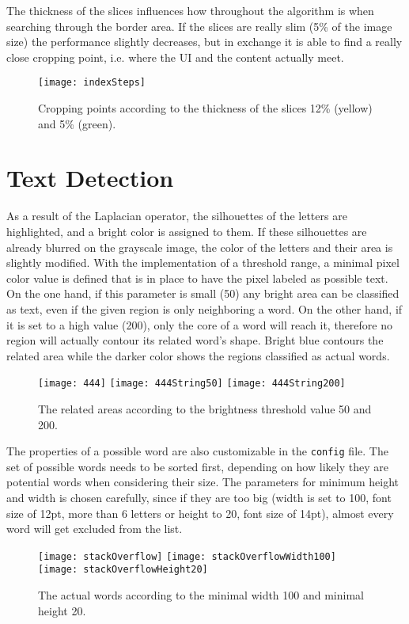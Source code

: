 \documentclass[draft,final]{vutinfth} %
\begin{document}
	The thickness of the slices influences how throughout the algorithm is when searching through the border area.
	If the slices are really slim (5\% of the image size) the performance slightly decreases, but in exchange it is able to find a really close cropping point, i.e. where the UI and the content actually meet.\par
	\begin{figure}[H]
		\centering
		\texttt{[image: indexSteps]}
		\caption{Cropping points according to the thickness of the slices 12\% (yellow) and 5\% (green).}
		\label{fig:res:steps}
	\end{figure}
	\section{Text Detection}
	As a result of the Laplacian operator, the silhouettes of the letters are highlighted, and a bright color is assigned to them. 
	If these silhouettes are already blurred on the grayscale image, the color of the letters and their area is slightly modified. 
	With the implementation of a threshold range, a minimal pixel color value is defined that is in place to have the pixel labeled as possible text.
	On the one hand, if this parameter is small (50) any bright area can be classified as text, even if the given region is only neighboring a word.
	On the other hand, if it is set to a high value (200), only the core of a word will reach it, therefore no region will actually contour its related word's shape.
	Bright blue contours the related area while the darker color shows the regions classified as actual words.\par
	\begin{figure}[H]
		\texttt{[image: 444]}\hfill
		\texttt{[image: 444String50]}\hfill
		\texttt{[image: 444String200]}
		\caption{The related areas according to the brightness threshold value 50 and 200. }
	\end{figure} 
	The properties of a possible word are also customizable in the \texttt{config} file.
	The set of possible words needs to be sorted first, depending on how likely they are potential words when considering their size.
	The parameters for minimum height and width is chosen carefully, since if they are too big (width is set to 100, font size of 12pt, more than 6 letters or height to 20, font size of 14pt), almost every word will get excluded from the list.
	\begin{figure}[H]
		\texttt{[image: stackOverflow]}\hfill
		\texttt{[image: stackOverflowWidth100]}\hfill
		\texttt{[image: stackOverflowHeight20]}
		\caption{The actual words according to the minimal width 100 and minimal height 20. }
	\end{figure}  
\end{document}
